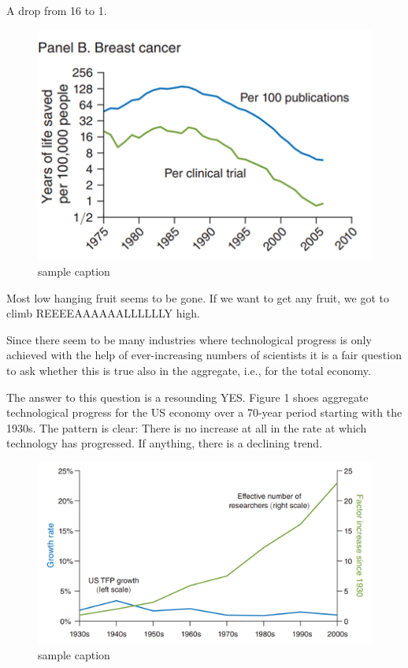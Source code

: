 \documentclass[
]{book}
\begin{document}
A drop from 16 to 1.

\begin{figure}
\includegraphics[width=1\linewidth]{img/ch1/moore19} \caption{sample caption}\label{fig:fig119}
\end{figure}

Most low hanging fruit seems to be gone. If we want to get any fruit, we got to climb REEEEAAAAAALLLLLLY high.

Since there seem to be many industries where technological progress is only achieved with the help of ever-increasing numbers of scientists it is a fair question to ask whether this is true also in the aggregate, i.e., for the total economy.

The answer to this question is a resounding YES. Figure 1 shoes aggregate technological progress for the US economy over a 70-year period starting with the 1930s. The pattern is clear: There is no increase at all in the rate at which technology has progressed. If anything, there is a declining trend.

\begin{figure}
\includegraphics[width=1\linewidth]{img/ch1/moore20} \caption{sample caption}\label{fig:fig120}
\end{figure}
\end{document}
